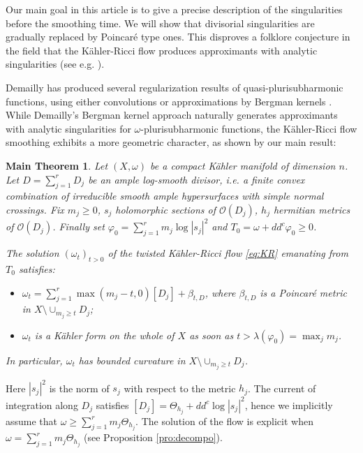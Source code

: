 \documentclass[11pt]{amsart}
\numberwithin{equation}{section}
\newtheorem*{thmM}{Main Theorem}
\newcommand{\f}{\varphi}
\newcommand \la {\lambda}
\begin{document}
 

Our main goal in this article  is to give a precise description of the singularities before the smoothing time.
We will show that divisorial singularities are gradually replaced by Poincaré type ones.
This disproves  a folklore conjecture in the field that the K\"ahler-Ricci flow produces approximants with analytic singularities 
(see e.g. \cite[Question 43]{DGZ16}).

\smallskip

Demailly has produced several regularization results of quasi-plurisubharmonic functions, using either 
convolutions \cite{Dem92} or approximations by Bergman kernels \cite{DPS01}.
While Demailly's Bergman kernel approach naturally generates approximants with analytic singularities 
for $\omega$-plurisubharmonic functions,  
the K\"ahler-Ricci flow smoothing exhibits a more geometric character,
as shown by our main result:
 
 \begin{thmM} \label{thm:A}
 Let $(X,\omega)$ be a compact K\"ahler manifold of dimension $n$.
 Let $D=\sum_{j=1}^r D_j$ be an ample log-smooth divisor, i.e. a finite 
convex combination of irreducible smooth ample hypersurfaces with simple normal crossings.
Fix $m_j \geq 0$, $s_j$ holomorphic sections of ${\mathcal O}(D_j)$,
$h_j$ hermitian metrics of ${\mathcal O}(D_j)$. Finally set $\f_0=\sum_{j=1}^r m_j \log |s_j|^2$
and $T_0=\omega+dd^c \f_0 \geq 0$.

The solution $(\omega_t)_{t>0}$ of the twisted K\"ahler-Ricci flow  \eqref{eq:KR} emanating from $T_0$
satisfies:
   \begin{itemize}
   \item    $\omega_t= \sum_{j=1}^r \max(m_j-t,0)  [D_j] + 	\beta_{t,D}$,
   where $\beta_{t,D}$ is a  Poincaré metric in $X \setminus \cup_{m_j \geq t} D_j$;
   \item   $\omega_t$ is  a K\"ahler form on the whole of $X$ as soon as $t>\la(\f_0)=\max_j m_j$.
   \end{itemize}
   In particular, $\omega_t$ has bounded curvature in $X \setminus \cup_{m_j \geq t} D_j$.
 \end{thmM}


Here $|s_j|^2$ is the norm of $s_j$  with respect to the metric $h_j$. 
The current of integration along $D_j$ satisfies
$[D_j]=\Theta_{h_j}+dd^c \log |s_j|^2$, hence we implicitly assume that
$\omega \geq \sum_{j=1}^r m_j \Theta_{h_j}$.
The solution of the flow is explicit when $\omega = \sum_{j=1}^r m_j \Theta_{h_j}$ 
(see Proposition \ref{pro:decompo}).
\end{document}
